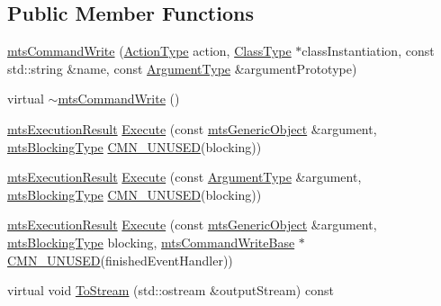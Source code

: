 \subsection*{Public Member Functions}
\begin{DoxyCompactItemize}
\item 
\hyperlink{classmts_command_write_ae9a351c406c99b4a49f475dc8b9c01f9}{mts\-Command\-Write} (\hyperlink{classmts_command_write_a1327ec4d03afcafbbbd91c8fc3f3c090}{Action\-Type} action, \hyperlink{classmts_command_write_aeccc8c434133c4adae34916b42ad493c}{Class\-Type} $\ast$class\-Instantiation, const std\-::string \&name, const \hyperlink{classmts_command_write_aa8ff942dbc4caedb34d83a5d6bf47c10}{Argument\-Type} \&argument\-Prototype)
\item 
virtual \hyperlink{classmts_command_write_aae4aa76caa281ece10b9993f7504735e}{$\sim$mts\-Command\-Write} ()
\item 
\hyperlink{classmts_execution_result}{mts\-Execution\-Result} \hyperlink{classmts_command_write_aecd4e16e77585b7913f115488be313e3}{Execute} (const \hyperlink{classmts_generic_object}{mts\-Generic\-Object} \&argument, \hyperlink{mts_forward_declarations_8h_ad7426ccb6c883bc780d0ee197dddcbe7}{mts\-Blocking\-Type} \hyperlink{cmn_portability_8h_a021894e2626935fa2305434b1e893ff6}{C\-M\-N\-\_\-\-U\-N\-U\-S\-E\-D}(blocking))
\item 
\hyperlink{classmts_execution_result}{mts\-Execution\-Result} \hyperlink{classmts_command_write_a404fee8a20e392018253f71aa4ccb848}{Execute} (const \hyperlink{classmts_command_write_aa8ff942dbc4caedb34d83a5d6bf47c10}{Argument\-Type} \&argument, \hyperlink{mts_forward_declarations_8h_ad7426ccb6c883bc780d0ee197dddcbe7}{mts\-Blocking\-Type} \hyperlink{cmn_portability_8h_a021894e2626935fa2305434b1e893ff6}{C\-M\-N\-\_\-\-U\-N\-U\-S\-E\-D}(blocking))
\item 
\hyperlink{classmts_execution_result}{mts\-Execution\-Result} \hyperlink{classmts_command_write_a3b67b44b7bd102b2cdd3ed01432aeb5c}{Execute} (const \hyperlink{classmts_generic_object}{mts\-Generic\-Object} \&argument, \hyperlink{mts_forward_declarations_8h_ad7426ccb6c883bc780d0ee197dddcbe7}{mts\-Blocking\-Type} blocking, \hyperlink{classmts_command_write_base}{mts\-Command\-Write\-Base} $\ast$\hyperlink{cmn_portability_8h_a021894e2626935fa2305434b1e893ff6}{C\-M\-N\-\_\-\-U\-N\-U\-S\-E\-D}(finished\-Event\-Handler))
\item 
virtual void \hyperlink{classmts_command_write_ab3e448149765a7588cf74b04e03dcf52}{To\-Stream} (std\-::ostream \&output\-Stream) const 
\end{DoxyCompactItemize}
